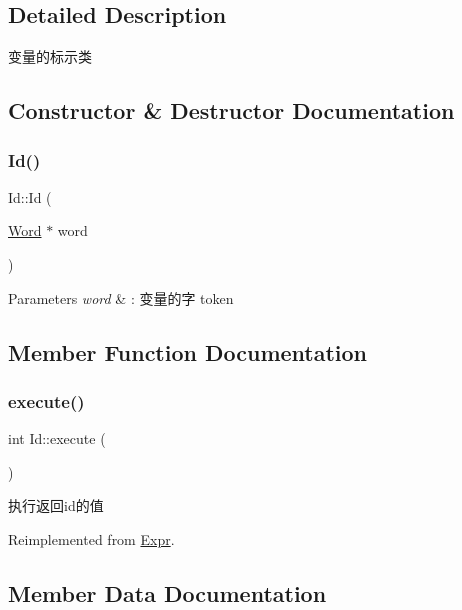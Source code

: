 \subsection{Detailed Description}
变量的标示类 

\subsection{Constructor \& Destructor Documentation}
\mbox{\label{class_id_a22122a40c4a61b6d2f7d20a3cc7c7275}} 
\subsubsection{\texorpdfstring{Id()}{Id()}}
{\footnotesize\ttfamily Id\+::\+Id (\begin{DoxyParamCaption}\item[{\hyperlink{class_word}{Word} $\ast$}]{word }\end{DoxyParamCaption})}


\begin{DoxyParams}{Parameters}
{\em word} & \+: 变量的字 token \\
\hline
\end{DoxyParams}


\subsection{Member Function Documentation}
\mbox{\label{class_id_ae43a9ffecbbc0ac4fd041b8e8e3c3de0}} 
\subsubsection{\texorpdfstring{execute()}{execute()}}
{\footnotesize\ttfamily int Id\+::execute (\begin{DoxyParamCaption}{ }\end{DoxyParamCaption})\hspace{0.3cm}{\ttfamily [virtual]}}



执行返回id的值 



Reimplemented from \hyperlink{class_expr_aff6a2e6eaa460e2a3db28ebdab089b51}{Expr}.



\subsection{Member Data Documentation}
\mbox{\label{class_id_af7f7ed479b45ce150b88481b7b996e32}} 
